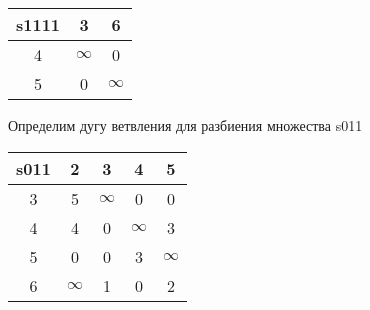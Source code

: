 \documentclass[a4paper,10pt]{report} %
\begin{document}
\begin{table}[ht]
\hfill
{}
\end{table}


\begin{tabular}[]{|c|c|c|}
\hline
s1111 & 3 & 6\\
\hline
4 & $\infty$ &      0\\
\hline
5 &      0 & $\infty$\\
\hline
\end{tabular}
\newpage


Определим дугу ветвления для разбиения множества  s011\\
\begin{flushleft}\begin{tabular}[]{|c|c|c|c|c|}
\hline
s011 & 2 & 3 & 4 & 5\\
\hline
3 &      5 & $\infty$ &      0 &      0\\
\hline
4 &      4 &      0 & $\infty$ &      3\\
\hline
5 &      0 &      0 &      3 & $\infty$\\
\hline
6 & $\infty$ &      1 &      0 &      2\\
\hline
\end{tabular}
\end{flushleft}
\end{document}
